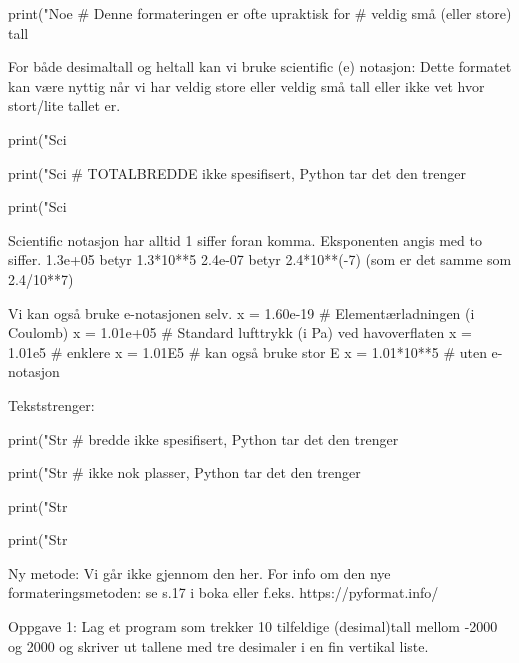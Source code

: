 print("Noe %
                                     # Denne formateringen er ofte upraktisk for 
                                     # veldig små (eller store) tall



For både desimaltall og heltall kan vi bruke scientific (e) notasjon: 
Dette formatet kan være nyttig når vi har veldig store eller veldig små tall 
eller ikke vet hvor stort/lite tallet er. 

print("Sci %

print("Sci %
                                         # TOTALBREDDE ikke spesifisert, Python tar det den trenger

print("Sci %

Scientific notasjon har alltid 1 siffer foran komma.
Eksponenten angis med to siffer.
1.3e+05 betyr 1.3*10**5
2.4e-07 betyr 2.4*10**(-7)   (som er det samme som 2.4/10**7)

Vi kan også bruke e-notasjonen selv.
x = 1.60e-19    # Elementærladningen (i Coulomb) 
x = 1.01e+05    # Standard lufttrykk (i Pa) ved havoverflaten 
x = 1.01e5      # enklere
x = 1.01E5      # kan også bruke stor E
x = 1.01*10**5  # uten e-notasjon


Tekststrenger: %

print("Str %
                                  # bredde ikke spesifisert, Python tar det den trenger

print("Str %
                                  # ikke nok plasser, Python tar det den trenger

print("Str %

print("Str %




Ny metode:
Vi går ikke gjennom den her. 
For info om den nye formateringsmetoden: se s.17 i boka eller f.eks. https://pyformat.info/



Oppgave 1: Lag et program som trekker 10 tilfeldige (desimal)tall mellom 
-2000 og 2000 og skriver ut tallene med tre desimaler i en fin vertikal liste.

